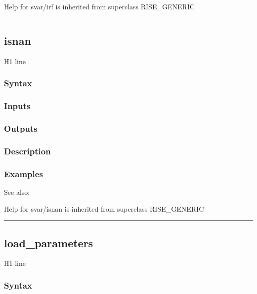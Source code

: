 \documentclass[letterpaper,10pt,english]{sphinxmanual}
\begin{document}
Help for svar/irf is inherited from superclass RISE\_GENERIC


\bigskip\hrule{}\bigskip



\subsection{isnan}
\label{classes/models/@svar/svar:isnan}\label{classes/models/@svar/svar:id38}
H1 line


\subsubsection{Syntax}
\label{classes/models/@svar/svar:id39}

\subsubsection{Inputs}
\label{classes/models/@svar/svar:id40}

\subsubsection{Outputs}
\label{classes/models/@svar/svar:id41}

\subsubsection{Description}
\label{classes/models/@svar/svar:id42}

\subsubsection{Examples}
\label{classes/models/@svar/svar:id43}
See also:

Help for svar/isnan is inherited from superclass RISE\_GENERIC


\bigskip\hrule{}\bigskip



\subsection{load\_parameters}
\label{classes/models/@svar/svar:id44}\label{classes/models/@svar/svar:load-parameters}
H1 line


\subsubsection{Syntax}
\label{classes/models/@svar/svar:id45}
\end{document}
